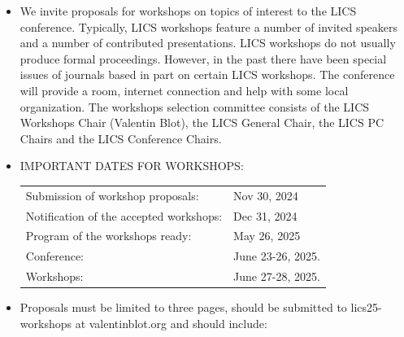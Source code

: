 \documentclass[prodmode,acmtecs]{acmsmall} %
\begin{document}
\begin{itemize}\item  We invite proposals for workshops on topics of interest to the LICS conference. Typically, LICS workshops feature a number of invited speakers and a number of contributed presentations. LICS workshops do not usually produce formal proceedings. However, in the past there have been special issues of journals based in part on certain LICS workshops. The conference will provide a room, internet connection and help with some local organization. The workshops selection committee consists of the LICS Workshops Chair (Valentin Blot), the LICS General Chair, the LICS PC Chairs and the LICS Conference Chairs. 
 
\item  IMPORTANT DATES FOR WORKSHOPS: 
 
\begin{tabulary}{\linewidth}{LL}Submission of workshop proposals:  & Nov 30, 2024 \\
Notification of the accepted workshops:  & Dec 31, 2024 \\
Program of the workshops ready:  & May 26, 2025 \\
Conference:  & June 23-26, 2025. \\
Workshops:  & June 27-28, 2025. \\
\end{tabulary}
 
\item  Proposals must be limited to three pages, should be submitted to lics25-workshops at valentinblot.org and should include: 
 

\end{itemize}
\end{document}
